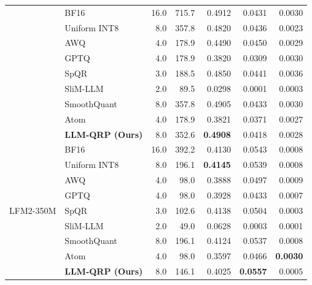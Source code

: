 \begin{table}[htbp]
\begin{small}
\begin{sc}
\begin{tabular}{llrrrrr}
 & BF16 & 16.0 & 715.7 & 0.4912 & 0.0431 & 0.0030 \\
 & Uniform INT8 & 8.0 & 357.8 & 0.4820 & 0.0436 & 0.0023 \\
 & AWQ & 4.0 & 178.9 & 0.4490 & 0.0450 & 0.0029 \\
 & GPTQ & 4.0 & 178.9 & 0.3820 & 0.0309 & 0.0030 \\
 & SpQR & 3.0 & 188.5 & 0.4850 & 0.0441 & 0.0036 \\
 & SliM-LLM & 2.0 & 89.5 & 0.0298 & 0.0001 & 0.0003 \\
 & SmoothQuant & 8.0 & 357.8 & 0.4905 & 0.0433 & 0.0030 \\
 & Atom & 4.0 & 178.9 & 0.3821 & 0.0371 & 0.0027 \\
 & \textbf{LLM-QRP (Ours)} & 8.0 & 352.6 & \textbf{0.4908} & 0.0418 & 0.0028 \\
\midrule
\multirow{9}{*}{LFM2-350M}
 & BF16 & 16.0 & 392.2 & 0.4130 & 0.0543 & 0.0008 \\
 & Uniform INT8 & 8.0 & 196.1 & \textbf{0.4145} & 0.0539 & 0.0008 \\
 & AWQ & 4.0 & 98.0 & 0.3888 & 0.0497 & 0.0009 \\
 & GPTQ & 4.0 & 98.0 & 0.3928 & 0.0433 & 0.0007 \\
 & SpQR & 3.0 & 102.6 & 0.4138 & 0.0504 & 0.0003 \\
 & SliM-LLM & 2.0 & 49.0 & 0.0628 & 0.0003 & 0.0001 \\
 & SmoothQuant & 8.0 & 196.1 & 0.4124 & 0.0537 & 0.0008 \\
 & Atom & 4.0 & 98.0 & 0.3597 & 0.0466 & \textbf{0.0030} \\
 & \textbf{LLM-QRP (Ours)} & 8.0 & 146.1 & 0.4025 & \textbf{0.0557} & 0.0005 \\
\bottomrule
\end{tabular}
\end{sc}
\end{small}
\vskip -0.1in
\end{table}
